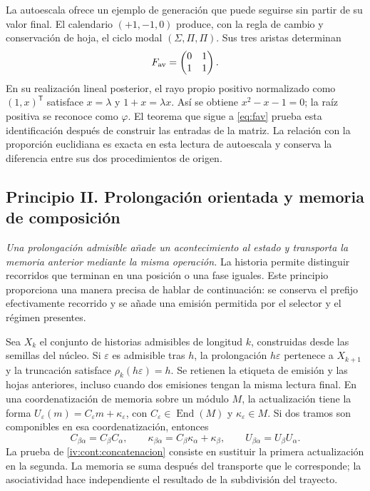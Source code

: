 La autoescala ofrece un ejemplo de generación que puede seguirse sin partir
de su valor final. El calendario \((+1,-1,0)\) produce, con la regla de
cambio y conservación de hoja, el ciclo modal
\((\Sigma,\Pi,\Pi)\). Sus tres aristas determinan
\[
 F_{\rm av}=\begin{pmatrix}0&1\\1&1\end{pmatrix}.
\]
En su realización lineal posterior, el rayo propio positivo normalizado
como \((1,x)^{\mathsf T}\) satisface \(x=\lambda\) y
\(1+x=\lambda x\). Así se obtiene \(x^2-x-1=0\); la raíz positiva se
reconoce como \(\varphi\). El teorema que sigue a \eqref{eq:fav} prueba
esta identificación después de construir las entradas de la matriz.
La relación con la proporción euclidiana es exacta en esta lectura de
autoescala y conserva la diferencia entre sus dos procedimientos de origen.

\subsection*{Principio II. Prolongación orientada y memoria de composición}
\hypertarget{prinh:prolongacion}{}

\emph{Una prolongación admisible añade un acontecimiento al estado y
transporta la memoria anterior mediante la misma operación.} La historia
permite distinguir recorridos que terminan en una posición o una fase
iguales. Este principio proporciona una manera precisa de hablar de
continuación: se conserva el prefijo efectivamente recorrido y se añade
una emisión permitida por el selector y el régimen presentes.

Sea \(X_k\) el conjunto de historias admisibles de longitud \(k\),
construidas desde las semillas del núcleo. Si \(\varepsilon\) es admisible
tras \(h\), la prolongación \(h\varepsilon\) pertenece a \(X_{k+1}\)
y la truncación satisface \(\rho_k(h\varepsilon)=h\). Se retienen la
etiqueta de emisión y las hojas anteriores, incluso cuando dos emisiones
tengan la misma lectura final. En una coordenatización de memoria sobre un módulo
\(M\), la actualización tiene la forma
\(U_\varepsilon(m)=C_\varepsilon m+\kappa_\varepsilon\), con
\(C_\varepsilon\in\operatorname{End}(M)\) y
\(\kappa_\varepsilon\in M\). Si dos tramos son componibles en esa
coordenatización, entonces
\[
 C_{\beta\alpha}=C_\beta C_\alpha,\qquad
 \kappa_{\beta\alpha}=C_\beta\kappa_\alpha+\kappa_\beta,
 \qquad U_{\beta\alpha}=U_\beta U_\alpha.
\]
La prueba de \cref{iv:cont:concatenacion} consiste en sustituir la primera
actualización en la segunda. La memoria se suma después del transporte que
le corresponde; la asociatividad hace independiente el resultado de la
subdivisión del trayecto.

